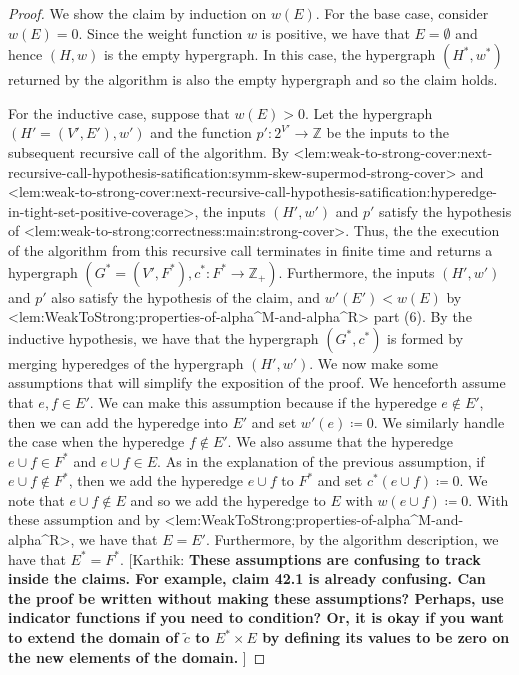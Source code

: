 \documentclass{article}
\def\Cref#1{<#1>}%
\newcommand{\knote}[1]{{\color{red}[{\tiny Karthik: \bf #1}]\marginpar{\color{red}*}}}
\providecommand{\Z}{\mathbb{Z}}
\begin{document}
\iffalse
\begin{proof}
    We show the claim by induction on $w(E)$. For the base case, consider $w(E) = 0$. Since the weight function $w$ is positive, we have that $E = \emptyset$ and hence $(H, w)$ is the empty hypergraph. In this case, the hypergraph $(H^*, w^*)$ returned by the algorithm is also the empty hypergraph and so the claim holds. 

    For the inductive case, suppose that $w(E) > 0$. Let the hypergraph $(H' = (V', E'), w')$ and the function $p':2^{V'}\rightarrow\Z$ be the inputs to the subsequent recursive call of the algorithm. By \Cref{lem:weak-to-strong-cover:next-recursive-call-hypothesis-satification:symm-skew-supermod-strong-cover} and \Cref{lem:weak-to-strong-cover:next-recursive-call-hypothesis-satification:hyperedge-in-tight-set-positive-coverage}, the inputs $(H',w')$ and $p'$ satisfy the hypothesis of \Cref{lem:weak-to-strong:correctness:main:strong-cover}. Thus, the the execution of the algorithm from this recursive call terminates in finite time and returns a hypergraph $(G^* = (V', F^*), c^*:F^*\rightarrow\Z_+)$. Furthermore, the inputs 
$(H', w')$ and $p'$ also satisfy the hypothesis of the claim, and $w'(E') < w(E)$ by \Cref{lem:WeakToStrong:properties-of-alpha^M-and-alpha^R} part (6). By the inductive hypothesis, we have that the hypergraph $(G^*, c^*)$ is formed by merging hyperedges of the hypergraph $(H', w')$. We now make some assumptions that will simplify the exposition of the proof. We henceforth assume that  $e, f \in E'$. We can make this assumption because if the hyperedge $e \not \in E'$, then we can add the hyperedge into $E'$ and set $w'(e) \coloneqq  0$. We similarly handle the case when the hyperedge $f \not \in E'$. We also assume that the hyperedge $e \cup f \in F^*$ and $e \cup f \in E$. As in the explanation of the previous assumption, if $e\cup f \not \in F^*$, then we add the hyperedge $e \cup f$ to $F^*$ and set $c^*(e\cup f) \coloneqq  0$. We note that $e\cup f \not \in E$ and so we add the hyperedge to $E$ with $w(e\cup f) \coloneqq  0$. With these assumption and by \Cref{lem:WeakToStrong:properties-of-alpha^M-and-alpha^R}, we have that $E = E'$. Furthermore, by the algorithm description, we have that  $E^* = F^*$. \knote{These assumptions are confusing to track inside the claims. For example, claim 42.1 is already confusing. Can the proof be written without making these assumptions? Perhaps, use indicator functions if you need to condition? Or, it is okay if you want to extend the domain of $\tilde{c}$ to $E^*\times E$ by defining its values to be zero on the new elements of the domain. }


\end{proof}
\end{document}
